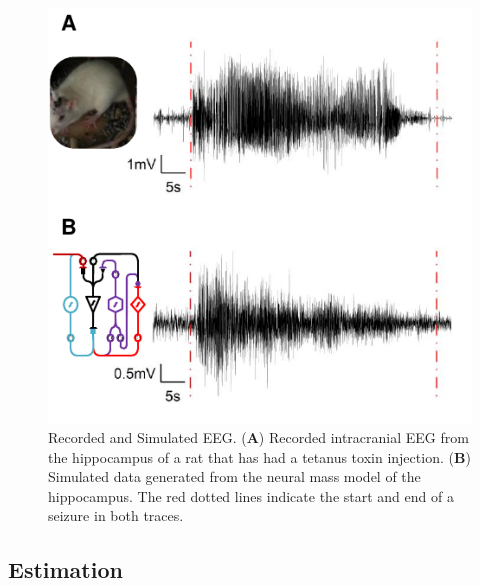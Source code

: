 \begin{figure}[ht]
 	\centering
 		\includegraphics{fig/EEG.pdf}
 	\caption{Recorded and Simulated EEG. (\textbf{A}) Recorded intracranial EEG from the hippocampus of a rat that has had a tetanus toxin injection. (\textbf{B}) Simulated data generated from the neural mass model of the hippocampus. The red dotted lines indicate the start and end of a seizure in both traces.}
 	\label{fig: EEG}
 \end{figure}

\subsection{Estimation}

